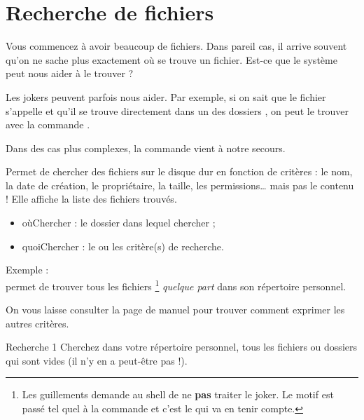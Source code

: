 \documentclass[a4paper,11pt]{style-esi/td}
\begin{document}
\section{Recherche de fichiers}

	Vous commencez à avoir beaucoup de fichiers.
	Dans pareil cas, 
	il arrive souvent qu'on ne sache plus exactement où se trouve un fichier.
	Est-ce que le système peut nous aider à le trouver ?

	Les jokers peuvent parfois nous aider.
	Par exemple, si on sait que le fichier s'appelle 
	et qu'il se trouve directement dans un des dossiers ,
	on peut le trouver avec 
	la commande .
	
	Dans des cas plus complexes, la commande  vient à notre secours.

	\medskip
	\begin{coltbox}{}
		
		\medskip
		Permet de chercher des fichiers
		sur le disque dur en fonction de critères :
		le nom, la date de création, le propriétaire, la taille,
		les permissions\dots{}  {\color{colalert}mais pas le contenu !}
		Elle affiche la liste des fichiers trouvés.
		\begin{itemize}
		\item \og{}oùChercher\fg{} : le dossier dans lequel chercher ;
		\item \og{}quoiChercher\fg{} : le ou les critère(s) de recherche.
		\end{itemize}
	\end{coltbox}

	\medskip
	Exemple : 
	\\permet de trouver tous les fichiers %
	\footnote{
		Les guillements demande au shell de ne \textbf{pas}
		traiter le joker. Le motif est passé tel quel à la commande
		et c'est le  qui va en tenir compte.
	} \emph{quelque part}
	dans son répertoire personnel.

	On vous laisse consulter la page de manuel pour trouver comment
	exprimer les autres critères.

	\begin{Exercice}{Recherche 1}
		Cherchez dans votre répertoire personnel,
		tous les fichiers ou dossiers qui sont vides
		(il n'y en a peut-être pas !).
	\end{Exercice}
\end{document}
